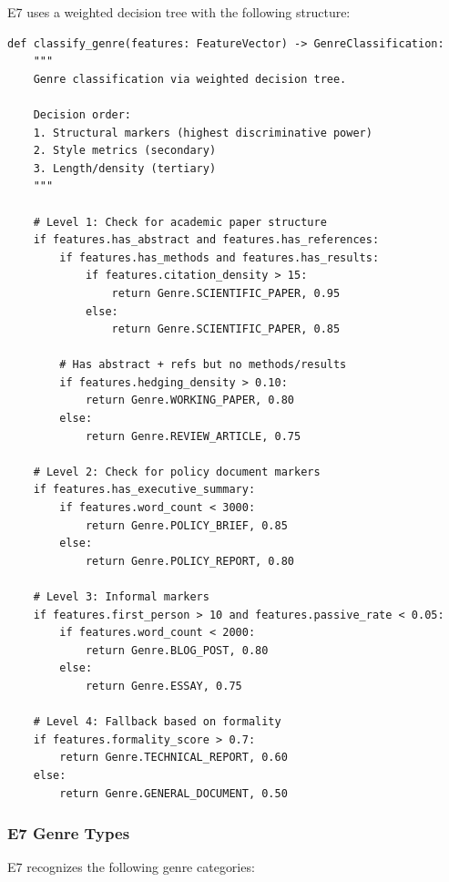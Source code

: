 E7 uses a weighted decision tree with the following structure:

\begin{verbatim}
def classify_genre(features: FeatureVector) -> GenreClassification:
    """
    Genre classification via weighted decision tree.

    Decision order:
    1. Structural markers (highest discriminative power)
    2. Style metrics (secondary)
    3. Length/density (tertiary)
    """

    # Level 1: Check for academic paper structure
    if features.has_abstract and features.has_references:
        if features.has_methods and features.has_results:
            if features.citation_density > 15:
                return Genre.SCIENTIFIC_PAPER, 0.95
            else:
                return Genre.SCIENTIFIC_PAPER, 0.85

        # Has abstract + refs but no methods/results
        if features.hedging_density > 0.10:
            return Genre.WORKING_PAPER, 0.80
        else:
            return Genre.REVIEW_ARTICLE, 0.75

    # Level 2: Check for policy document markers
    if features.has_executive_summary:
        if features.word_count < 3000:
            return Genre.POLICY_BRIEF, 0.85
        else:
            return Genre.POLICY_REPORT, 0.80

    # Level 3: Informal markers
    if features.first_person > 10 and features.passive_rate < 0.05:
        if features.word_count < 2000:
            return Genre.BLOG_POST, 0.80
        else:
            return Genre.ESSAY, 0.75

    # Level 4: Fallback based on formality
    if features.formality_score > 0.7:
        return Genre.TECHNICAL_REPORT, 0.60
    else:
        return Genre.GENERAL_DOCUMENT, 0.50
\end{verbatim}

\subsubsection{E7 Genre Types}

E7 recognizes the following genre categories:

